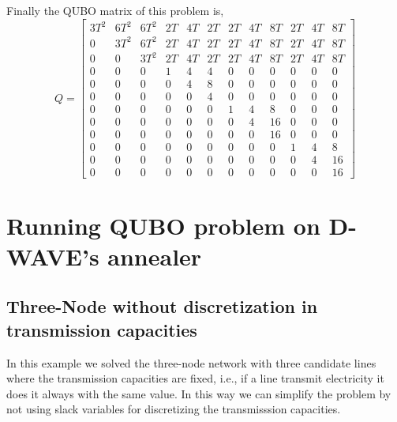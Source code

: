 Finally the QUBO matrix of this problem is,
\begin{equation}
Q =
        \begin{bmatrix}
           3T^{2} & 6T^{2} & 6T^{2} & 2T & 4T & 2T & 2T & 4T & 8T &2T & 4T & 8T  \\
           0 &3T^{2}& 6T^{2} & 2T & 4T & 2T & 2T & 4T & 8T &2T & 4T & 8T \\
           0 & 0 & 3T^{2} &2T & 4T & 2T & 2T & 4T & 8T &2T & 4T & 8T \\
           0 & 0 & 0 & 1 & 4 & 4 & 0 & 0 & 0 & 0 & 0 & 0\\
           0 & 0 & 0 & 0 & 4 & 8 & 0 & 0 & 0 & 0 & 0 & 0\\
           0 & 0 & 0 & 0 & 0 & 4 & 0 & 0 & 0 & 0 & 0 & 0\\
           0 & 0 & 0 & 0 & 0 & 0 & 1 & 4 & 8 & 0 & 0 & 0\\
           0 & 0 & 0 & 0 & 0 & 0 & 0 & 4 & 16& 0 & 0 & 0\\
           0 & 0 & 0 & 0 & 0 & 0 & 0 & 0 & 16& 0 & 0 & 0\\
           0 & 0 & 0 & 0 & 0 & 0 & 0 & 0 & 0 & 1 & 4 & 8 \\
           0 & 0 & 0 & 0 & 0 & 0 & 0 & 0 & 0 & 0 & 4 & 16\\
           0 & 0 & 0 & 0 & 0 & 0 & 0 & 0 & 0 & 0 & 0 & 16
         \end{bmatrix}
\end{equation}
\section{Running QUBO problem on D-WAVE's annealer}
\subsection{Three-Node without discretization in transmission capacities}
In this example we solved the three-node network with three candidate lines where the transmission capacities are fixed, i.e., if a line transmit electricity it does it always with the same value. In this way we can simplify the problem by not using slack variables for discretizing the transmisssion capacities.